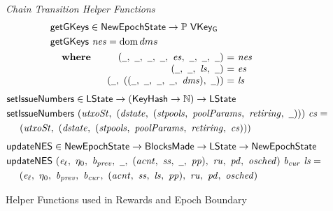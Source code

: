 \begin{figure}[htb]
  \emph{Chain Transition Helper Functions}
  \begin{align*}
      & \fun{getGKeys} \in \NewEpochState \to \powerset{\VKeyGen} \\
      & \fun{getGKeys}~\var{nes} = \dom{dms} \\
      &
      \begin{array}{lr@{~=~}l}
        \where
          & (\wcard,~\wcard,~\wcard,~\wcard,~\var{es},~\wcard,~\wcard,~\wcard)
          & \var{nes}
          \\
          & (\wcard,~\wcard,~\var{ls},~\wcard)
          & \var{es}
          \\
          & (\wcard,~((\wcard,~\wcard,~\wcard,~\wcard,~\var{dms}),~\wcard))
          & \var{ls}
      \end{array}
  \end{align*}
  \begin{align*}
      & \fun{setIssueNumbers} \in \LState \to (\KeyHash\to\N) \to \LState \\
      & \fun{setIssueNumbers}~
          (\var{utxoSt},
          ~(\var{dstate},~(\var{stpools},~\var{poolParams},~\var{retiring},~\wcard)))
          ~\var{cs} = \\
      & ~~~~
          (\var{utxoSt},
          ~(\var{dstate},~(\var{stpools},~\var{poolParams},~\var{retiring},~\var{cs})))
  \end{align*}
  \begin{align*}
      & \fun{updateNES} \in \NewEpochState \to \BlocksMade \to \LState \to \NewEpochState \\
      & \fun{updateNES}~
      (\var{e_\ell},~\eta_0,~\var{b_{prev}},~\wcard,~(\var{acnt},~\var{ss},~\wcard,~\var{pp}),
       ~\var{ru},~\var{pd},~\var{osched})
          ~\var{b_{cur}}~\var{ls} = \\
      & ~~~~
      (\var{e_\ell},~\eta_0,~\var{b_{prev}},~\var{b_{cur}},
       ~(\var{acnt},~\var{ss},~\var{ls},~\var{pp}),~\var{ru},~\var{pd},~\var{osched})
  \end{align*}

  \caption{Helper Functions used in Rewards and Epoch Boundary}
  \label{fig:funcs:chain-helper}
\end{figure}

